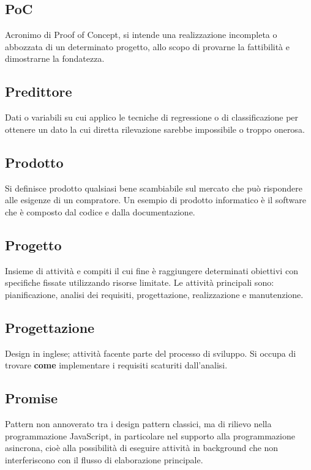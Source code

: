 \subsection*{PoC}
Acronimo di Proof of Concept, si intende una realizzazione incompleta o abbozzata di un determinato progetto, allo scopo di provarne la fattibilità e dimostrarne la fondatezza.


\subsection*{Predittore}
Dati o variabili su cui applico le tecniche di regressione o di classificazione per ottenere un dato la cui diretta rilevazione sarebbe impossibile o troppo onerosa.

\subsection*{Prodotto}
Si definisce prodotto qualsiasi bene scambiabile sul mercato che può rispondere alle esigenze di un compratore. Un esempio di prodotto informatico è il software che è composto dal codice e dalla documentazione.

\subsection*{Progetto}
Insieme di attività e compiti il cui fine è raggiungere determinati obiettivi con specifiche fissate utilizzando risorse limitate. Le attività principali sono: pianificazione, analisi dei requisiti, progettazione, realizzazione e manutenzione.

\subsection*{Progettazione}
Design in inglese; attività facente parte del processo di sviluppo. Si occupa di trovare \textbf{come} implementare i requisiti scaturiti dall'analisi.

\subsection*{Promise}
Pattern non annoverato tra i design pattern classici, ma di rilievo nella programmazione JavaScript, in particolare nel supporto alla programmazione asincrona, cioè alla possibilità di eseguire attività in background che non interferiscono con il flusso di elaborazione principale. 

